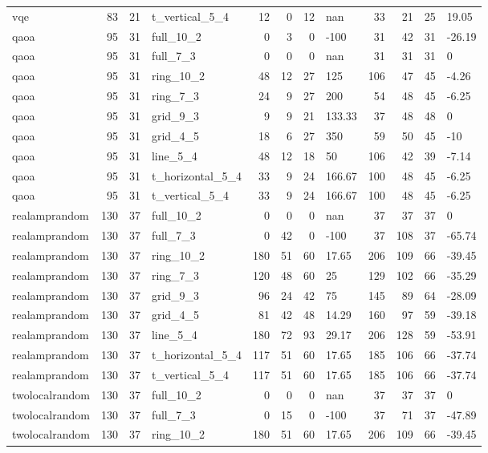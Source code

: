 \begin{longtable}{lrrlrrrlrrrl}
vqe & 83 & 21 & t\_vertical\_5\_4 & 12 & 0 & 12 & nan & 33 & 21 & 25 & 19.05 \\
qaoa & 95 & 31 & full\_10\_2 & 0 & 3 & 0 & -100 & 31 & 42 & 31 & -26.19 \\
qaoa & 95 & 31 & full\_7\_3 & 0 & 0 & 0 & nan & 31 & 31 & 31 & 0 \\
qaoa & 95 & 31 & ring\_10\_2 & 48 & 12 & 27 & 125 & 106 & 47 & 45 & -4.26 \\
qaoa & 95 & 31 & ring\_7\_3 & 24 & 9 & 27 & 200 & 54 & 48 & 45 & -6.25 \\
qaoa & 95 & 31 & grid\_9\_3 & 9 & 9 & 21 & 133.33 & 37 & 48 & 48 & 0 \\
qaoa & 95 & 31 & grid\_4\_5 & 18 & 6 & 27 & 350 & 59 & 50 & 45 & -10 \\
qaoa & 95 & 31 & line\_5\_4 & 48 & 12 & 18 & 50 & 106 & 42 & 39 & -7.14 \\
qaoa & 95 & 31 & t\_horizontal\_5\_4 & 33 & 9 & 24 & 166.67 & 100 & 48 & 45 & -6.25 \\
qaoa & 95 & 31 & t\_vertical\_5\_4 & 33 & 9 & 24 & 166.67 & 100 & 48 & 45 & -6.25 \\
realamprandom & 130 & 37 & full\_10\_2 & 0 & 0 & 0 & nan & 37 & 37 & 37 & 0 \\
realamprandom & 130 & 37 & full\_7\_3 & 0 & 42 & 0 & -100 & 37 & 108 & 37 & -65.74 \\
realamprandom & 130 & 37 & ring\_10\_2 & 180 & 51 & 60 & 17.65 & 206 & 109 & 66 & -39.45 \\
realamprandom & 130 & 37 & ring\_7\_3 & 120 & 48 & 60 & 25 & 129 & 102 & 66 & -35.29 \\
realamprandom & 130 & 37 & grid\_9\_3 & 96 & 24 & 42 & 75 & 145 & 89 & 64 & -28.09 \\
realamprandom & 130 & 37 & grid\_4\_5 & 81 & 42 & 48 & 14.29 & 160 & 97 & 59 & -39.18 \\
realamprandom & 130 & 37 & line\_5\_4 & 180 & 72 & 93 & 29.17 & 206 & 128 & 59 & -53.91 \\
realamprandom & 130 & 37 & t\_horizontal\_5\_4 & 117 & 51 & 60 & 17.65 & 185 & 106 & 66 & -37.74 \\
realamprandom & 130 & 37 & t\_vertical\_5\_4 & 117 & 51 & 60 & 17.65 & 185 & 106 & 66 & -37.74 \\
twolocalrandom & 130 & 37 & full\_10\_2 & 0 & 0 & 0 & nan & 37 & 37 & 37 & 0 \\
twolocalrandom & 130 & 37 & full\_7\_3 & 0 & 15 & 0 & -100 & 37 & 71 & 37 & -47.89 \\
twolocalrandom & 130 & 37 & ring\_10\_2 & 180 & 51 & 60 & 17.65 & 206 & 109 & 66 & -39.45 \\

\end{longtable}
